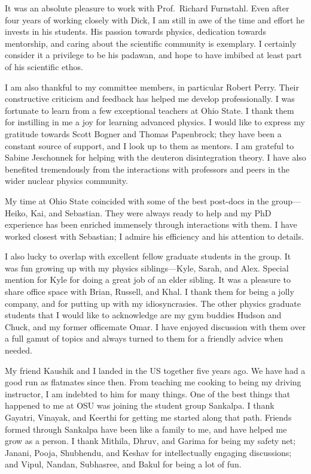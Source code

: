 \begin{acknowledgments}

  It was an absolute pleasure to work with Prof.\ Richard Furnstahl.  Even after
  four years of working closely with Dick, I am still in awe of the time and
  effort he invests in his students.  His passion towards physics, dedication
  towards mentorship, and caring about the scientific community is exemplary.
  I certainly consider it a privilege to be his padawan, and hope to have
  imbibed at least part of his scientific ethos.

  I am also thankful to my committee members, in particular Robert
  Perry.  Their constructive criticism and feedback has helped me develop
  professionally.  I was fortunate to learn from a few exceptional
  teachers at Ohio State.  I thank them for instilling in me a joy for learning
  advanced physics.  I would like to express my gratitude towards
  Scott Bogner and Thomas Papenbrock; they have been a constant source of
  support, and I look up to them as mentors.  I am grateful to
  Sabine Jeschonnek for helping with the deuteron disintegration theory.
  I have also benefited tremendously from the interactions with professors
  and peers in the wider nuclear physics community.

  My time at Ohio State coincided with some of the best
  post-docs in the group---Heiko, Kai, and Sebastian.  They were always ready
  to help and my PhD experience has
  been enriched immensely through interactions with them.  I have worked
  closest with Sebastian; I admire his efficiency and his attention to details.

  I also lucky to overlap with excellent fellow graduate students in the group.
  It was fun growing up with my physics siblings---Kyle, Sarah, and Alex.
  Special mention for Kyle for doing a great job of an elder sibling.
  It was a pleasure to share office space with Brian, Russell, and Khal.
  I thank them for being a jolly company, and for putting up with my
  idiosyncrasies.  The other physics graduate students that I would like
  to acknowledge are my gym buddies Hudson and Chuck, and my former officemate
  Omar.  I have enjoyed discussion with them over a full gamut of topics and
  always turned to them for a friendly advice when needed.

  My friend Kaushik and I landed in the US together five years ago.  We have had
  a good run as flatmates since then.  From teaching me cooking to being my
  driving
  instructor, I am indebted to him for many things.  One of the best things
  that happened to me at OSU was joining the student group Sankalpa.  I thank
  Gayatri, Vinayak, and Keerthi for getting me started along that path.
  Friends formed through Sankalpa have been like a family to me, and have
  helped me grow as a person.  I thank Mithila, Dhruv, and Garima for being
  my safety net; Janani, Pooja, Shubhendu, and Keshav for intellectually
  engaging discussions; and Vipul, Nandan, Subhasree, and Bakul for being
  a lot of fun.


\end{acknowledgments}
